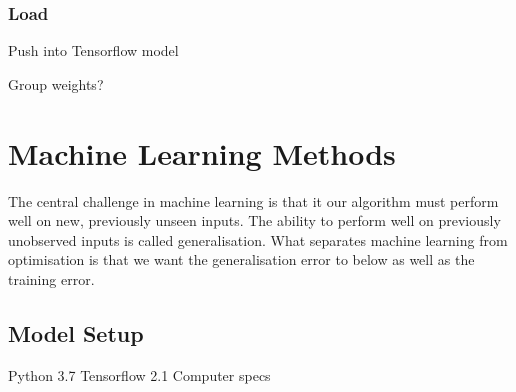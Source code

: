 \subsubsection{Load}
Push into Tensorflow model

Group weights?


\section{Machine Learning Methods}
The central challenge in machine learning is that it our algorithm must perform well on new, previously unseen inputs. The ability to perform well on previously unobserved inputs is called generalisation.
What separates machine learning from optimisation is that we want the generalisation error to below as well as the training error.\cite{Goodfellow2015}

\subsection{Model Setup}
Python 3.7
Tensorflow 2.1
Computer specs



